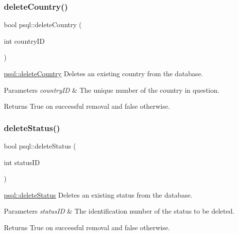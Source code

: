\subsubsection{\texorpdfstring{delete\+Country()}{deleteCountry()}}
{\footnotesize\ttfamily bool psql\+::delete\+Country (\begin{DoxyParamCaption}\item[{int}]{country\+ID }\end{DoxyParamCaption})}



\mbox{\hyperlink{classpsql_a914bf8701fbed4ff80edcd0d09c7c3fd}{psql\+::delete\+Country}} Deletes an existing country from the database. 


\begin{DoxyParams}{Parameters}
{\em country\+ID} & The unique number of the country in question. \\
\hline
\end{DoxyParams}
\begin{DoxyReturn}{Returns}
True on successful removal and false otherwise. 
\end{DoxyReturn}
\mbox{\label{classpsql_a26fc592cfb9f484e1bee62af527f2b95}} 
\subsubsection{\texorpdfstring{delete\+Status()}{deleteStatus()}}
{\footnotesize\ttfamily bool psql\+::delete\+Status (\begin{DoxyParamCaption}\item[{int}]{status\+ID }\end{DoxyParamCaption})}



\mbox{\hyperlink{classpsql_a26fc592cfb9f484e1bee62af527f2b95}{psql\+::delete\+Status}} Deletes an existing status from the database. 


\begin{DoxyParams}{Parameters}
{\em status\+ID} & The identification number of the status to be deleted. \\
\hline
\end{DoxyParams}
\begin{DoxyReturn}{Returns}
True on successful removal and false otherwise. 
\end{DoxyReturn}
\mbox{\label{classpsql_a2ad41caea89dc5af0b55b12f6394fbf5}} 
